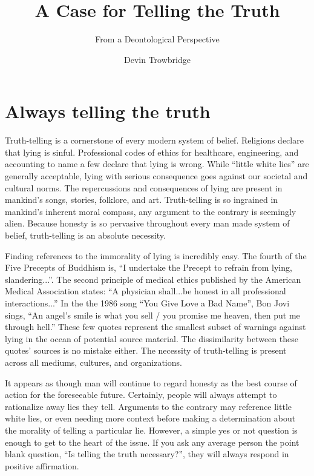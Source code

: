 \documentclass[format=sigconf]{acmart}
\title{A Case for Telling the Truth}
\subtitle{From a Deontological Perspective}
\author{Devin Trowbridge}
\affiliation{%
  \department{Computer Science and Software Engineering}
  \institution{Auburn University }
  \email{dkt0003@auburn.edu}
  \city{Huntsville}
  \state{Alabama}
  \country{United States}}
\begin{document}
\maketitle

\section{Always telling the truth}
Truth-telling is a cornerstone of every modern system of belief. Religions declare that lying is sinful. Professional codes of ethics for healthcare, engineering, and accounting to name a few declare that lying is wrong. While ``little white lies'' are generally acceptable, lying with serious consequence goes against our societal and cultural norms. The repercussions and consequences of lying are present in mankind's songs, stories, folklore, and art. Truth-telling is so ingrained in mankind's inherent moral compass, any argument to the contrary is seemingly alien. Because honesty is so pervasive throughout every man made system of belief, truth-telling is an absolute necessity.

Finding references to the immorality of lying is incredibly easy. The fourth of the Five Precepts of Buddhism is, ``I undertake the Precept to refrain from lying, slandering...''. The second principle of medical ethics published by the American Medical Association states: ``A physician shall...be honest in all professional interactions...'' \cite{amaethics} In the the 1986 song ``You Give Love a Bad Name'', Bon Jovi sings, ``An angel's smile is what you sell / you promise me heaven, then put me through hell.'' \cite{bonjovi} These few quotes represent the smallest subset of warnings against lying in the ocean of potential source material. The dissimilarity between these quotes' sources is no mistake either. The necessity of truth-telling is present across all mediums, cultures, and organizations.

It appears as though man will continue to regard honesty as the best course of action for the foreseeable future. Certainly, people will always attempt to rationalize away lies they tell. Arguments to the contrary may reference little white lies, or even needing more context before making a determination about the morality of telling a particular lie.  However, a simple yes or not question is enough to get to the heart of the issue. If you ask any average person the point blank question, ``Is telling the truth necessary?'', they will always respond in positive affirmation. 

\medskip



\end{document}
